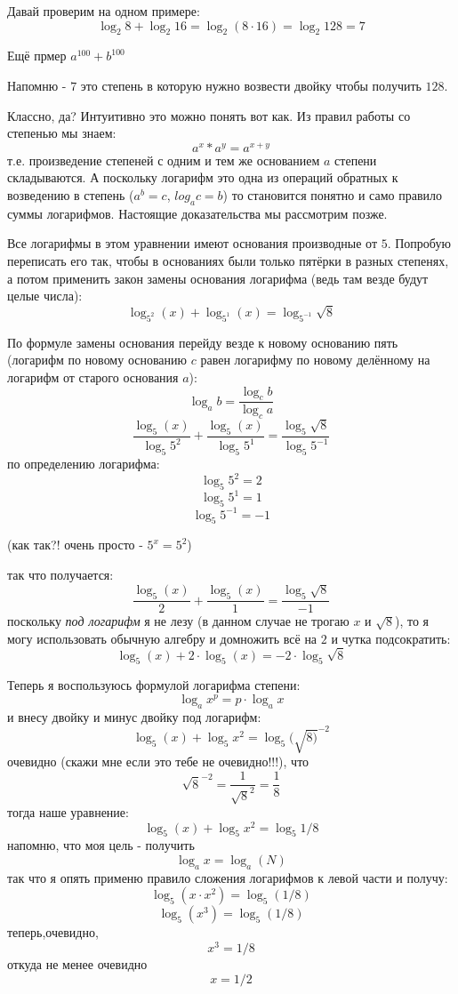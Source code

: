 \documentclass{article}
\begin{document}
Давай проверим на одном примере:
$$\log_{2}{8}+\log_{2}{16} = \log_{2}{(8\cdot{}16)} = \log_{2}{128} = 7$$

Ещё прмер $a^{100}+b^{100}$

Напомню - $7$ это степень в которую нужно возвести двойку чтобы получить $128$.

Классно, да? Интуитивно это можно понять вот как. Из правил работы со степенью мы знаем:
$$a^{x}*a^{y} = a^{x+y}$$
т.е. произведение степеней с одним и тем же основанием $a$ степени складываются. А поскольку логарифм это одна из операций обратных к возведению в степень ($a^b=c$, $log_a{c}=b$) то становится понятно и само правило суммы логарифмов. Настоящие доказательства мы рассмотрим позже.

Все логарифмы в этом уравнении имеют основания производные от $5$. Попробую переписать его так, чтобы в основаниях были только пятёрки в разных степенях, а потом применить закон замены основания логарифма (ведь там везде будут целые числа):
$$\log_{5^2}{(x)}+\log_{5^1}{(x)}=\log_{5^{-1}}{\sqrt{8}}$$

По формуле замены основания перейду везде к новому основанию пять (логарифм по новому основанию $c$ равен логарифму по новому делённому на логарифм от старого основания $a$):
$$\log_{a}{b}=\frac{\log_{c}{b}}{\log_{c}{a}}$$
$$\frac{\log_{5}{(x)}}{\log_{5}{5^2}}+\frac{\log_{5}{(x)}}{\log_{5}{5^1}}=\frac{\log_{5}{\sqrt{8}}}{\log_{5}{5^{-1}}}$$
по определению логарифма:
$$\log_{5}{5^2}=2$$
$$\log_{5}{5^1}=1$$
$$\log_{5}{5^{-1}}=-1$$

(как так?! очень просто - $5^x=5^2$)

так что получается:
$$\frac{\log_{5}{(x)}}{2}+\frac{\log_{5}{(x)}}{1}=\frac{\log_{5}{\sqrt{8}}}{-1}$$
поскольку \textit{под логарифм} я не лезу (в данном случае не трогаю $x$ и $\sqrt{8}$), то я могу использовать обычную алгебру и домножить всё на $2$ и чутка подсократить:
$$\log_{5}{(x)}+2\cdot\log_{5}{(x)}=-2\cdot\log_{5}{\sqrt{8}}$$

Теперь я воспользуюсь формулой логарифма степени:
$$\log_{a}{x^p}=p\cdot\log_{a}{x}$$
и внесу двойку и минус двойку под логарифм:
$$\log_{5}{(x)}+\log_{5}{x^2}=\log_{5}{(\sqrt{8)}^{-2}}$$
очевидно (скажи мне если это тебе не очевидно!!!), что
$$\sqrt{8}^{-2} =\frac{1}{\sqrt{8}^2}=\frac{1}{8}$$
тогда наше уравнение:
$$\log_{5}{(x)}+\log_{5}{x^2}=\log_{5}{1/8}$$
напомню, что моя цель - получить
$$\log_{a}{x}=\log_{a}{(N)}$$
так что я опять применю правило сложения логарифмов к левой части и получу:
$$\log_{5}{(x\cdot{}x^2)}=\log_{5}{(1/8)}$$
$$\log_{5}{(x^3)}=\log_{5}{(1/8)}$$
теперь,очевидно,
$$x^3 = 1/8$$
откуда не менее очевидно
$$x = 1/2$$
\end{document}
